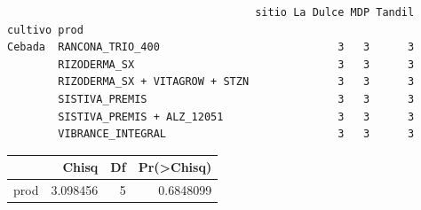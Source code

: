 \documentclass[
  letterpaper,
  DIV=11,
  numbers=noendperiod]{scrartcl}
\begin{document}
\begin{verbatim}
                                       sitio La Dulce MDP Tandil
cultivo prod                                                    
Cebada  RANCONA_TRIO_400                            3   3      3
        RIZODERMA_SX                                3   3      3
        RIZODERMA_SX + VITAGROW + STZN              3   3      3
        SISTIVA_PREMIS                              3   3      3
        SISTIVA_PREMIS + ALZ_12051                  3   3      3
        VIBRANCE_INTEGRAL                           3   3      3
\end{verbatim}

\begin{longtable}[]{@{}lrrr@{}}
\toprule()
& Chisq & Df & Pr(\textgreater Chisq) \\
\midrule()
\endhead
prod & 3.098456 & 5 & 0.6848099 \\
\bottomrule()
\end{longtable}
\end{document}
